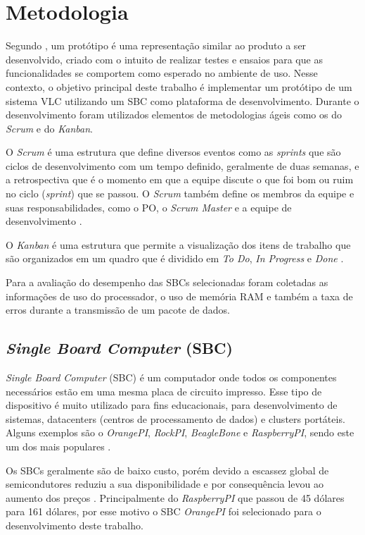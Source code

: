 \section{Metodologia}

Segundo , um protótipo é uma representação similar ao produto a ser desenvolvido, criado com o intuito de realizar testes e ensaios para que as funcionalidades se comportem como esperado no ambiente de uso. Nesse contexto, o objetivo principal deste trabalho é implementar um protótipo de um sistema VLC utilizando um SBC como plataforma de desenvolvimento. Durante o desenvolvimento foram utilizados elementos de metodologias ágeis como os do \textit{Scrum} e do \textit{Kanban}.

O \textit{Scrum} é uma estrutura que define diversos eventos como as \textit{sprints} que são ciclos de desenvolvimento com um tempo definido, geralmente de duas semanas, e a retrospectiva que é o momento em que a equipe discute o que foi bom ou ruim no ciclo (\textit{sprint}) que se passou. O \textit{Scrum} também define os membros da equipe e suas responsabilidades, como o PO, o \textit{Scrum Master} e a equipe de desenvolvimento \cite{scrum}. 

O \textit{Kanban} é uma estrutura que permite a visualização dos itens de trabalho que são organizados em um quadro que é dividido em \textit{To Do}, \textit{In Progress} e \textit{Done} \cite{kanbam}.

Para a avaliação do desempenho das SBCs selecionadas foram coletadas as informações de uso do processador, o uso de memória RAM e também a taxa de erros durante a transmissão de um pacote de dados.

\subsection{\textit{Single Board Computer} (SBC)}

\textit{Single Board Computer} (SBC) é um computador onde todos os componentes necessários estão em uma mesma placa de circuito impresso. Esse tipo de dispositivo é muito utilizado para fins educacionais, para desenvolvimento de sistemas, datacenters (centros  de  processamento  de  dados) e clusters portáteis. Alguns exemplos são o \textit{OrangePI}, \textit{RockPI}, \textit{BeagleBone} e \textit{RaspberryPI}, sendo este um dos mais populares \cite{SBC_edu}.

Os SBCs geralmente são de baixo custo, porém devido a escassez global de semicondutores reduziu a sua disponibilidade e por consequência levou ao aumento dos preços \cite{zeng_2022}. Principalmente do \textit{RaspberryPI} que passou de 45 dólares para 161 dólares, por esse motivo o SBC \textit{OrangePI} foi selecionado para o desenvolvimento deste trabalho.

